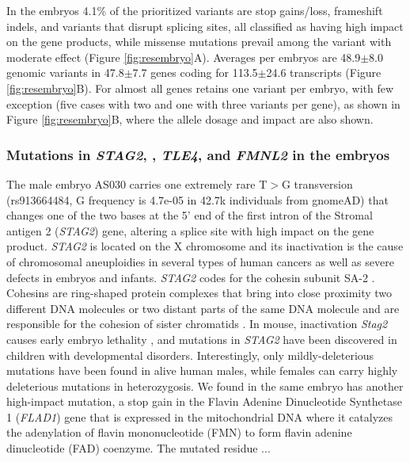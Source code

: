 In the embryos 4.1\% of the prioritized variants are stop gains/loss, frameshift indels, and variants that disrupt splicing sites, all classified as having high impact on the gene products, while missense mutations prevail among the variant with moderate effect (Figure \ref{fig:resembryo}A). Averages per embryos are 48.9$\pm$8.0 genomic variants in 47.8$\pm$7.7 genes coding for 113.5$\pm$24.6 transcripts (Figure \ref{fig:resembryo}B). For almost all genes \gp retains one variant per embryo, with few exception (five cases with two and one with three variants per gene), as shown in Figure \ref{fig:resembryo}B, where the allele dosage and impact are also shown. %

\subsubsection*{Mutations in \textit{STAG2}, , \textit{TLE4}, and \textit{FMNL2} in the embryos} 
The male embryo AS030 carries one extremely rare T$>$G transversion (rs913664484, G frequency is 4.7e-05 in 42.7k individuals from gnomeAD) that changes one of the two bases at the 5' end of the first intron of the Stromal antigen 2 (\textit{STAG2}) gene, altering a splice site with high impact on the gene product. \textit{STAG2} is located on the X chromosome and its inactivation is the cause of chromosomal aneuploidies in several types of human cancers\cite{solomon2011mutational} as well as severe defects in embryos and infants\cite{mullegama2017novo, mullegama2019mutations, aoi2020nonsense}.  \textit{STAG2} codes for the cohesin subunit SA-2 \cite{cuadrado2020specialized}. Cohesins are ring-shaped protein complexes that bring into close proximity two different DNA molecules or two distant parts of the same DNA molecule and are responsible for the cohesion of sister chromatids \cite{mcnicoll2013cohesin}. In mouse, inactivation \textit{Stag2} causes early embryo lethality \cite{de2020essential}, and  mutations in \textit{STAG2} have been discovered in children with developmental disorders\cite{study2015large}. Interestingly, only mildly-deleterious mutations have been found in alive human males, while females can carry highly deleterious mutations in heterozygosis\cite{mullegama2019mutations}. We found in the same embryo has another high-impact mutation, a stop gain in the Flavin Adenine Dinucleotide Synthetase 1 (\textit{FLAD1}) gene that is expressed in the mitochondrial DNA where it catalyzes the adenylation of flavin mononucleotide (FMN) to form flavin adenine dinucleotide (FAD) coenzyme. The mutated residue ... 


